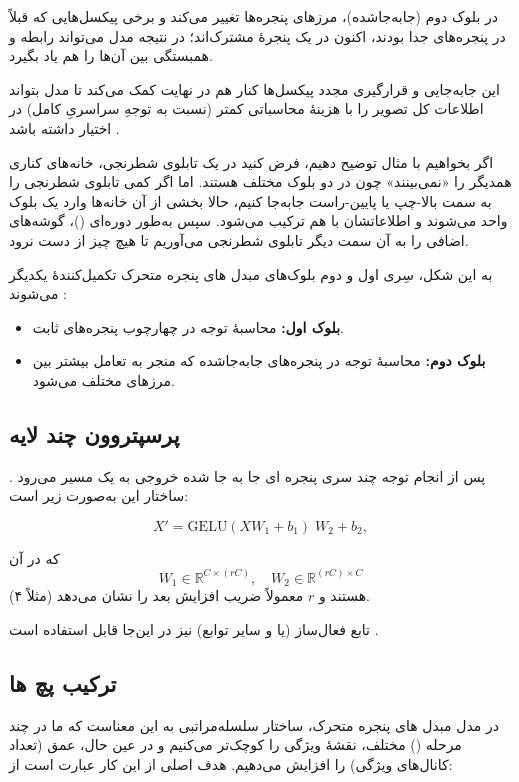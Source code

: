 در بلوک دوم (جابه‌جاشده)، مرزهای پنجره‌ها تغییر می‌کند و برخی پیکسل‌هایی که قبلاً در پنجره‌های جدا بودند، اکنون در یک پنجرهٔ مشترک‌اند؛ در نتیجه مدل می‌تواند رابطه و همبستگی بین آن‌ها را هم یاد بگیرد.

این جابه‌جایی و قرارگیری مجدد پیکسل‌ها کنار هم در نهایت کمک می‌کند تا مدل بتواند اطلاعات کل تصویر را با هزینهٔ محاسباتی کمتر (نسبت به توجهِ سراسریِ کامل) در اختیار داشته باشد \cite{liu2021swintransformer}.

اگر بخواهیم با مثال توضیح دهیم، فرض کنید در یک تابلوی شطرنجی، خانه‌های کناری همدیگر را «نمی‌بینند» چون در دو بلوک مختلف هستند.
اما اگر کمی تابلوی شطرنجی را به سمت بالا-چپ یا پایین-راست جابه‌جا کنیم،
حالا بخشی از آن خانه‌ها وارد یک بلوک واحد می‌شوند و اطلاعاتشان با هم ترکیب می‌شود.
سپس به‌طور دوره‌ای (\textit{})، گوشه‌های اضافی را به آن سمت دیگر تابلوی شطرنجی می‌آوریم
تا هیچ چیز از دست نرود.

به این شکل، سِری اول و دوم بلوک‌های مبدل های پنجره متحرک 
تکمیل‌کنندهٔ یکدیگر می‌شوند \cite{liu2021swintransformer}:
\begin{itemize}
	\item \textbf{بلوک اول:} محاسبهٔ توجه در چهارچوب پنجره‌های ثابت.
	\item \textbf{بلوک دوم:} محاسبهٔ  توجه در پنجره‌های جابه‌جاشده که منجر به تعامل بیشتر بین مرزهای مختلف می‌شود.
\end{itemize}


\subsection{پرسپتروون چند لایه}
پس از انجام توجه چند سری پنجره ای جا  به جا شده 
خروجی به یک مسیر \textbf{} می‌رود \cite{liu2021swintransformer}. ساختار این  به‌صورت زیر است:

\begin{equation}
	X' = \mathrm{GELU}(X W_1 + b_1) \; W_2 + b_2,
	\label{eq:gelu_transform}
\end{equation}

که در آن
\[
W_1 \in \mathbb{R}^{C \times (rC)}, 
\quad
W_2 \in \mathbb{R}^{(rC) \times C}
\]
هستند و \(\displaystyle r\) معمولاً ضریب افزایش بعد را نشان می‌دهد (مثلاً ۴). 

تابع فعال‌ساز  (یا  و سایر توابع) نیز در این‌جا قابل استفاده است \cite{hendrycks2016gelu}.

\subsection{ترکیب پچ ها}
در مدل مبدل های پنجره متحرک، ساختار سلسله‌مراتبی به این معناست که ما در چند مرحله () مختلف، نقشهٔ ویژگی را کوچک‌تر می‌کنیم و در عین حال، عمق (تعداد کانال‌های ویژگی) را افزایش می‌دهیم. هدف اصلی از این کار عبارت است از:

